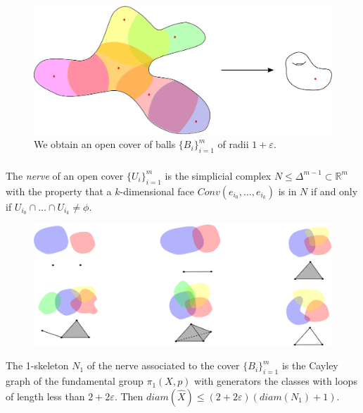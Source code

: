 \documentclass{beamer}
\begin{document}
\begin{frame}\frametitle{}

\begin{figure}
\centering
\includegraphics[scale=0.6]{Nerving9.eps}
\caption{We obtain an open cover of balls $\{ B_i \}_{i=1}^m$ of radii $1+\varepsilon$.}
\end{figure}


\end{frame}


\begin{frame}\frametitle{}


The \textit{nerve} of an open cover $\{ U_i \}_{i=1}^m$ is the simplicial complex $ N \leq \Delta^{m-1} \subset \mathbb{R}^m $ with the property that a $k$-dimensional face $  Conv (e_{i_0}, \ldots , e_{i_k}) $ is in $N$ if and only if $U_{i_0}\cap \ldots \cap U_{i_k} \neq \phi$.



\begin{figure}
\centering
\includegraphics[scale=0.5]{Nerved.eps}
\end{figure}

\pause


The 1-skeleton $N_1$ of the nerve associated to the cover $\{ B_i\}_{i=1}^m$ is the Cayley graph of the fundamental group $\pi_1(X,p)$ with generators the classes with loops of length less than $2+2\varepsilon$. \pause Then $diam(\hat{X}) \leq (2+2\varepsilon)(diam(N_1)+1)$.




\end{frame}
\end{document}
